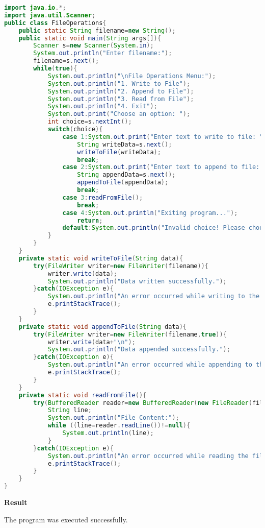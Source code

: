 \begin{lstlisting}[language=Java]
import java.io.*;
import java.util.Scanner;
public class FileOperations{
	public static String filename=new String();
	public static void main(String args[]){
		Scanner s=new Scanner(System.in);
		System.out.println("Enter filename:");
		filename=s.next();
		while(true){
			System.out.println("\nFile Operations Menu:");
			System.out.println("1. Write to File");
			System.out.println("2. Append to File");
			System.out.println("3. Read from File");
			System.out.println("4. Exit");
			System.out.print("Choose an option: ");
			int choice=s.nextInt();
			switch(choice){
				case 1:System.out.print("Enter text to write to file: ");
					String writeData=s.next();
					writeToFile(writeData);
					break;
				case 2:System.out.print("Enter text to append to file: ");
					String appendData=s.next();
					appendToFile(appendData);
					break;
				case 3:readFromFile();
					break;
				case 4:System.out.println("Exiting program...");
					return;
				default:System.out.println("Invalid choice! Please choose a valid option.");
			}
		}
	}
	private static void writeToFile(String data){
		try(FileWriter writer=new FileWriter(filename)){
			writer.write(data);
			System.out.println("Data written successfully.");
		}catch(IOException e){
			System.out.println("An error occurred while writing to the file.");
			e.printStackTrace();
		}
	}
	private static void appendToFile(String data){
		try(FileWriter writer=new FileWriter(filename,true)){
			writer.write(data+"\n");
			System.out.println("Data appended successfully.");
		}catch(IOException e){
			System.out.println("An error occurred while appending to the file.");
			e.printStackTrace();
		}
	}
	private static void readFromFile(){
		try(BufferedReader reader=new BufferedReader(new FileReader(filename))){
			String line;
			System.out.println("File Content:");
			while ((line=reader.readLine())!=null){
				System.out.println(line);
			}
		}catch(IOException e){
			System.out.println("An error occurred while reading the file.");
			e.printStackTrace();
		}
	}
}
\end{lstlisting}

\vspace{0.5cm}
\textbf{Result}
\vspace{0.5cm}

The program was executed successfully. 

